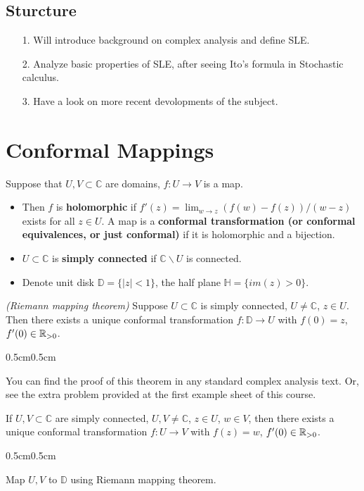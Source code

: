 \documentclass[12pt,a4paper]{article}
\newenvironment{proof}
{\begin{changemargin}{0.5cm}{0.5cm} 
	}%
	{\end{changemargin}
}
\begin{document}
\subsection{Sturcture}
\begin{itemize}
\item[1.] Will introduce background on complex analysis and define SLE.
\item[2.] Analyze basic properties of SLE, after seeing Ito's formula in Stochastic calculus.
\item[3.] Have a look on more recent devolopments of the subject.
\end{itemize}

\section{Conformal Mappings}

Suppose that $U, V \subset \mathbb{C}$ are domains, $f: U\rightarrow V$ is a map.

\begin{itemize}
\item Then $f$ is \textbf{holomorphic} if $f'(z)=\lim_{w\rightarrow z} (f(w)-f(z))/(w-z)$ exists for all $z\in U$. A map is a \textbf{conformal transformation (or conformal equivalences, or just conformal)} if it is holomorphic and a bijection. 
\item $U\subset \mathbb{C}$ is \textbf{simply connected} if $\mathbb{C}\backslash U$ is connected.
\item Denote unit disk $\mathbb{D} = \{|z|<1\}$, the half plane $\mathbb{H} = \{im(z)>0\}$.
\end{itemize}
\s

\thm \emph{(Riemann mapping theorem)} Suppose $U\subset \mathbb{C}$ is simply connected, $U\neq \mathbb{C}$, $z\in U$. Then there exists a unique conformal transformation $f: \mathbb{D}\rightarrow U$ with $f(0)=z$, $f'(0)\in \mathbb{R}_{>0}$.
\begin{proof}
\pf You can find the proof of this theorem in any standard complex analysis text. Or, see the extra problem provided at the first example sheet of this course.
\end{proof}
\s

\corr If $U, V\subset \mathbb{C}$ are simply connected, $U, V\neq \mathbb{C}$, $z\in U$, $w\in V$, then there exists a unique conformal transformation $f: U\rightarrow V$ with $f(z)=w$, $f'(0)\in \mathbb{R}_{>0}$.
\begin{proof}
\pf Map $U, V$ to $\mathbb{D}$ using Riemann mapping theorem. \eop
\end{proof}
\s
\end{document}
